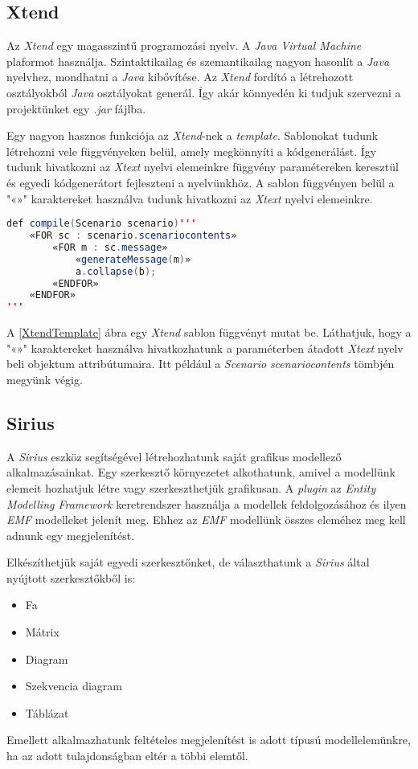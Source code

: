 \subsection{Xtend}

Az \textit{Xtend} egy magasszintű programozási nyelv.
A \textit{Java Virtual Machine} plaformot használja.
Szintaktikailag és szemantikailag nagyon hasonlít a \textit{Java} nyelvhez, mondhatni a \textit{Java} kibővítése.
Az \textit{Xtend} fordító a létrehozott osztályokból \textit{Java} osztályokat generál.
Így akár könnyedén ki tudjuk szervezni a projektünket egy \textit{.jar} fájlba.

Egy nagyon hasznos funkciója az \textit{Xtend}-nek a \textit{template}.
Sablonokat tudunk létrehozni vele függvényeken belül, amely megkönnyíti a kódgenerálást.
Így tudunk hivatkozni az \textit{Xtext} nyelvi elemeinkre függvény paramétereken keresztül és egyedi kódgenerátort fejleszteni a nyelvünkhöz.
A sablon függvényen belül a "«»" karaktereket használva tudunk hivatkozni az \textit{Xtext} nyelvi elemeinkre.

\begin{lstlisting}[language=java, frame=single, float=ht!, caption={Xtend template.},captionpos=b, label=XtendTemplate]
def compile(Scenario scenario)'''
	«FOR sc : scenario.scenariocontents»
		«FOR m : sc.message»
			«generateMessage(m)»
			a.collapse(b);
		«ENDFOR»
	«ENDFOR»
'''
\end{lstlisting}

A \ref{XtendTemplate} ábra egy \textit{Xtend} sablon függvényt mutat be.
Láthatjuk, hogy a "«»" karaktereket használva hivatkozhatunk a paraméterben átadott \textit{Xtext} nyelv beli objektum attribútumaira.
Itt például a \textit{Scenario} \textit{scenariocontents} tömbjén megyünk végig.

\subsection{Sirius}

A \textit{Sirius} eszköz segítségével létrehozhatunk saját grafikus modellező alkalmazásainkat.
Egy szerkesztő környezetet alkothatunk, amivel a modellünk elemeit hozhatjuk létre vagy szerkeszthetjük grafikusan.
A \textit{plugin} az \textit{Entity Modelling Framework} keretrendszer használja a modellek feldolgozásához és ilyen \textit{EMF} modelleket jelenít meg.
Ehhez az \textit{EMF} modellünk összes eleméhez meg kell adnunk egy megjelenítést.

Elkészíthetjük saját egyedi szerkesztőnket, de választhatunk a \textit{Sirius} által nyújtott szerkesztőkből is:
\begin{itemize}
	\item Fa
	\item Mátrix
	\item Diagram
	\item Szekvencia diagram
	\item Táblázat
\end{itemize}

Emellett alkalmazhatunk feltételes megjelenítést is adott típusú modellelemünkre, ha az adott tulajdonságban eltér a többi elemtől.